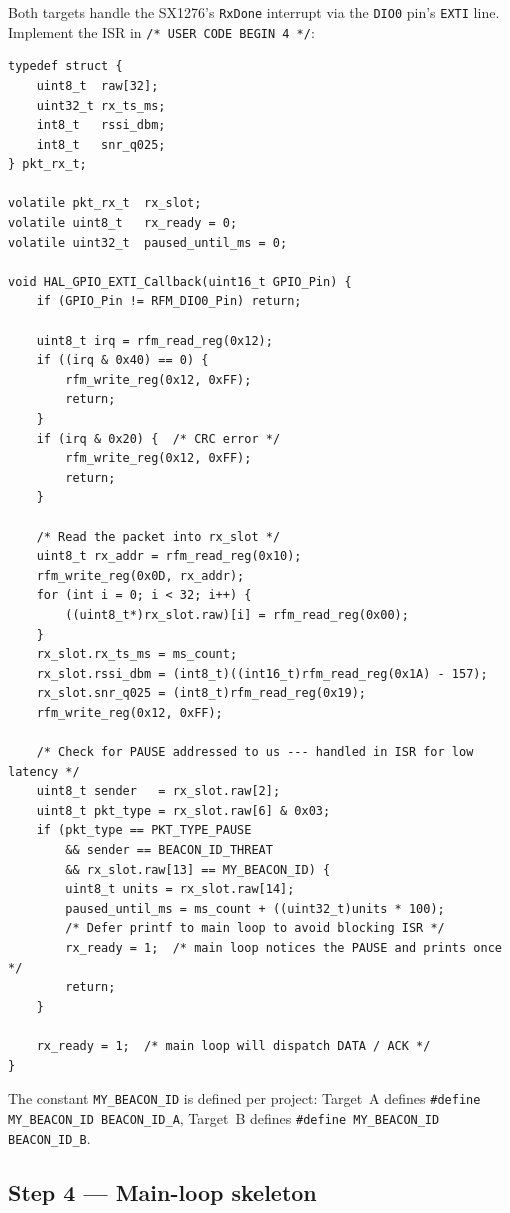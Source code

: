 \documentclass[11pt,letterpaper]{article}
\begin{document}
Both targets handle the SX1276's \texttt{RxDone} interrupt via the \texttt{DIO0} pin's \texttt{EXTI} line. Implement the ISR in \texttt{/* USER CODE BEGIN 4 */}:
\begin{verbatim}
typedef struct {
    uint8_t  raw[32];
    uint32_t rx_ts_ms;
    int8_t   rssi_dbm;
    int8_t   snr_q025;
} pkt_rx_t;

volatile pkt_rx_t  rx_slot;
volatile uint8_t   rx_ready = 0;
volatile uint32_t  paused_until_ms = 0;

void HAL_GPIO_EXTI_Callback(uint16_t GPIO_Pin) {
    if (GPIO_Pin != RFM_DIO0_Pin) return;

    uint8_t irq = rfm_read_reg(0x12);
    if ((irq & 0x40) == 0) {
        rfm_write_reg(0x12, 0xFF);
        return;
    }
    if (irq & 0x20) {  /* CRC error */
        rfm_write_reg(0x12, 0xFF);
        return;
    }

    /* Read the packet into rx_slot */
    uint8_t rx_addr = rfm_read_reg(0x10);
    rfm_write_reg(0x0D, rx_addr);
    for (int i = 0; i < 32; i++) {
        ((uint8_t*)rx_slot.raw)[i] = rfm_read_reg(0x00);
    }
    rx_slot.rx_ts_ms = ms_count;
    rx_slot.rssi_dbm = (int8_t)((int16_t)rfm_read_reg(0x1A) - 157);
    rx_slot.snr_q025 = (int8_t)rfm_read_reg(0x19);
    rfm_write_reg(0x12, 0xFF);

    /* Check for PAUSE addressed to us --- handled in ISR for low latency */
    uint8_t sender   = rx_slot.raw[2];
    uint8_t pkt_type = rx_slot.raw[6] & 0x03;
    if (pkt_type == PKT_TYPE_PAUSE
        && sender == BEACON_ID_THREAT
        && rx_slot.raw[13] == MY_BEACON_ID) {
        uint8_t units = rx_slot.raw[14];
        paused_until_ms = ms_count + ((uint32_t)units * 100);
        /* Defer printf to main loop to avoid blocking ISR */
        rx_ready = 1;  /* main loop notices the PAUSE and prints once */
        return;
    }

    rx_ready = 1;  /* main loop will dispatch DATA / ACK */
}
\end{verbatim}
The constant \texttt{MY\_BEACON\_ID} is defined per project: Target~A defines \texttt{\#define MY\_BEACON\_ID BEACON\_ID\_A}, Target~B defines \texttt{\#define MY\_BEACON\_ID BEACON\_ID\_B}.

\subsection{Step 4 --- Main-loop \FSM{} skeleton}
\end{document}
